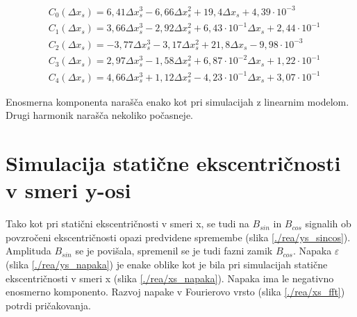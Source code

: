 \begin{eqnarray}
\label{real_xs_C0}
&C_0(\Delta x_s) =6,41\Delta x_s^{3}-6,66\Delta x_s^{2}+19,4\Delta x_s+4,39\cdot 10^{-3} \\     
&C_1(\Delta x_s) =3,66\Delta x_s^{3}-2,92\Delta x_s^{2}+6,43\cdot 10^{-1}\Delta x_s+2,44\cdot 10^{-1} \\
&C_2(\Delta x_s) =-3,77\Delta x_s^{3}-3,17\Delta x_s^{2}+21,8\Delta x_s-9,98\cdot 10^{-3} \\    
&C_3(\Delta x_s) =2,97\Delta x_s^{3}-1,58\Delta x_s^{2}+6,87\cdot 10^{-2}\Delta x_s+1,22\cdot 10^{-1} \\
\label{real_xs_C4}
&C_4(\Delta x_s) =4,66\Delta x_s^{3}+1,12\Delta x_s^{2}-4,23\cdot 10^{-1}\Delta x_s+3,07\cdot 10^{-1} 
\end{eqnarray}

Enosmerna komponenta narašča enako kot pri simulacijah z linearnim modelom. Drugi harmonik narašča nekoliko počasneje.
\section{Simulacija statične ekscentričnosti v smeri y-osi}
Tako kot pri statični ekscentričnosti v smeri x, se tudi na $B_{sin}$ in $B_{cos}$ signalih ob povzročeni ekscentričnosti opazi predvidene spremembe (slika \ref{./rea/ys_sincos}).  Amplituda $B_{sin}$ se je povišala, spremenil se je tudi fazni zamik $B_{cos}$.  Napaka $\varepsilon$ (slika \ref{./rea/ys_napaka}) je enake oblike kot je bila pri simulacijah statične ekscentričnosti v smeri x (slika \ref{./rea/xs_napaka}). Napaka ima le negativno enosmerno komponento. Razvoj napake v Fourierovo vrsto (slika \ref{./rea/xs_fft}) potrdi pričakovanja.
\newpage
